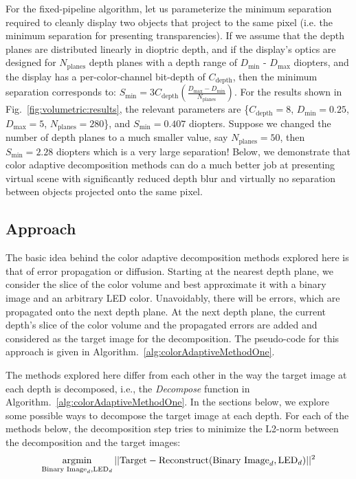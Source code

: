 For the fixed-pipeline algorithm, let us parameterize the minimum separation required to cleanly display two objects that project to the same pixel (i.e. the minimum separation for presenting transparencies). If we assume that the depth planes are distributed linearly in dioptric depth, and if the display's optics are designed for $N_{\text{planes}}$ depth planes with a depth range of $D_{\min}$ - $D_{\max}$ diopters, and the display has a per-color-channel bit-depth of $C_{\text{depth}}$, then the minimum separation corresponds to: $S_{\min} = 3C_{\text{depth}} \left(\frac{D_{\max} - D_{\min}}{N_{\text{planes}}}\right)$. For the results shown in Fig.~\ref{fig:volumetric:results}, the relevant parameters are \{$C_{\text{depth}}=8$, $D_{\min} = 0.25$, $D_{\max} = 5$, $N_{\text{planes}} = 280$\}, and $S_{\min} = 0.407$ diopters. Suppose we changed the number of depth planes to a much smaller value, say $N_{\text{planes}}=50$, then $S_{\min} = 2.28$ diopters which is a very large separation! Below, we demonstrate that color adaptive decomposition methods can do a much better job at presenting virtual scene with significantly reduced depth blur and virtually no separation between objects projected onto the same pixel. 

\subsection{Approach}
The basic idea behind the color adaptive decomposition methods explored here is that of error propagation or diffusion. 
Starting at the nearest depth plane, we consider the slice of the color volume and best approximate it with a binary image and an arbitrary LED color. 
Unavoidably, there will be errors, which are propagated onto the next depth plane. 
At the next depth plane, the current depth's slice of the color volume and the propagated errors are added and considered as the target image for the decomposition.
The pseudo-code for this approach is given in Algorithm.~\ref{alg:colorAdaptiveMethodOne}. 


The methods explored here differ from each other in the way the target image at each depth is decomposed, i.e., the \emph{Decompose} function in Algorithm.~\ref{alg:colorAdaptiveMethodOne}.
In the sections below, we explore some possible ways to decompose the target image at each depth.
For each of the methods below, the decomposition step tries to minimize the L2-norm between the decomposition and the target images:
\begin{equation}
    \operatorname*{arg\!\min}_{\text{Binary Image}_d,\text{LED}_d} ||\text{Target} - \text{Reconstruct}(\text{Binary Image}_d, \text{LED}_d) ||^2
\end{equation}

